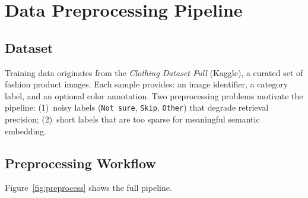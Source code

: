 \documentclass[12pt,a4paper]{article}
\begin{document}
\section{Data Preprocessing Pipeline}
\label{sec:data}

\subsection{Dataset}

Training data originates from the \emph{Clothing Dataset Full}
(Kaggle), a curated set of fashion product images.
Each sample provides: an image identifier, a category label,
and an optional color annotation.
Two preprocessing problems motivate the pipeline:
(1)~noisy labels (\texttt{Not sure}, \texttt{Skip},
\texttt{Other}) that degrade retrieval precision;
(2)~short labels that are too sparse for meaningful semantic embedding.

\subsection{Preprocessing Workflow}

Figure~\ref{fig:preprocess} shows the full pipeline.
\end{document}
